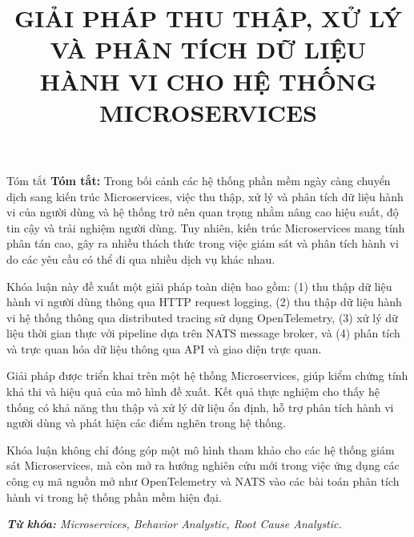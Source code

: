 \documentclass{uetgraduation}
\begin{document}
\title{GIẢI PHÁP THU THẬP, XỬ LÝ VÀ PHÂN TÍCH DỮ LIỆU HÀNH VI CHO HỆ THỐNG MICROSERVICES}
\makecovers

\begin{preamble}{Tóm tắt}
\textbf{Tóm tắt:}
Trong bối cảnh các hệ thống phần mềm ngày càng chuyển dịch sang kiến trúc Microservices, 
việc thu thập, xử lý và phân tích dữ liệu hành vi của người dùng và hệ thống trở nên quan trọng nhằm nâng cao hiệu suất, 
độ tin cậy và trải nghiệm người dùng. Tuy nhiên, kiến trúc Microservices mang tính phân tán cao,
gây ra nhiều thách thức trong việc giám sát và phân tích hành vi do các yêu cầu có thể đi qua nhiều dịch vụ khác nhau.

Khóa luận này đề xuất một giải pháp toàn diện bao gồm: 
(1) thu thập dữ liệu hành vi người dùng thông qua HTTP request logging, 
(2) thu thập dữ liệu hành vi hệ thống thông qua distributed tracing sử dụng OpenTelemetry, 
(3) xử lý dữ liệu thời gian thực với pipeline dựa trên NATS message broker, 
và (4) phân tích và trực quan hóa dữ liệu thông qua API và giao diện trực quan.

Giải pháp được triển khai trên một hệ thống Microservices, giúp kiểm chứng tính khả thi và hiệu quả của mô hình đề xuất. Kết quả thực nghiệm cho thấy hệ thống có khả năng thu thập và xử lý dữ liệu ổn định, hỗ trợ phân tích hành vi người dùng và phát hiện các điểm nghẽn trong hệ thống.

Khóa luận không chỉ đóng góp một mô hình tham khảo cho các hệ thống giám sát Microservices, mà còn mở ra hướng nghiên cứu mới trong việc ứng dụng các công cụ mã nguồn mở như OpenTelemetry và NATS vào các bài toán phân tích hành vi trong hệ thống phần mềm hiện đại.

\textit{\textbf{Từ khóa:} Microservices, Behavior Analystic, Root Cause Analystic.}
\end{preamble}
\end{document}
